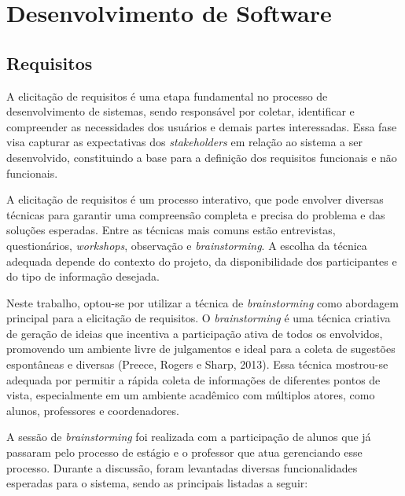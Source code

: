 
\chapter{Desenvolvimento de Software}

\section*{Requisitos}

A elicitação de requisitos é uma etapa fundamental no processo de desenvolvimento de sistemas, sendo responsável por coletar, identificar e compreender as necessidades dos usuários e demais partes interessadas. Essa fase visa capturar as expectativas dos \textit{stakeholders} em relação ao sistema a ser desenvolvido, constituindo a base para a definição dos requisitos funcionais e não funcionais.

A elicitação de requisitos é um processo interativo, que pode envolver diversas técnicas para garantir uma compreensão completa e precisa do problema e das soluções esperadas. Entre as técnicas mais comuns estão entrevistas, questionários, \textit{workshops}, observação e \textit{brainstorming}. A escolha da técnica adequada depende do contexto do projeto, da disponibilidade dos participantes e do tipo de informação desejada.

Neste trabalho, optou-se por utilizar a técnica de \textit{brainstorming} como abordagem principal para a elicitação de requisitos. O \textit{brainstorming} é uma técnica criativa de geração de ideias que incentiva a participação ativa de todos os envolvidos, promovendo um ambiente livre de julgamentos e ideal para a coleta de sugestões espontâneas e diversas (Preece, Rogers e Sharp, 2013). Essa técnica mostrou-se adequada por permitir a rápida coleta de informações de diferentes pontos de vista, especialmente em um ambiente acadêmico com múltiplos atores, como alunos, professores e coordenadores.

A sessão de \textit{brainstorming} foi realizada com a participação de alunos que já passaram pelo processo de estágio e o professor que atua gerenciando esse processo. Durante a discussão, foram levantadas diversas funcionalidades esperadas para o sistema, sendo as principais listadas a seguir:


